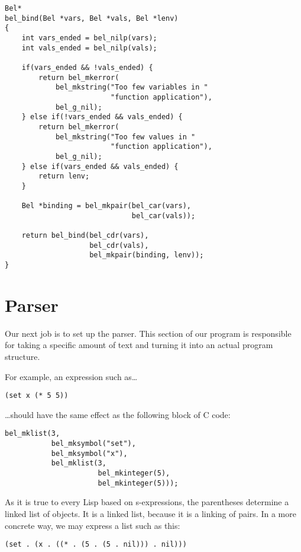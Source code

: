 \documentclass[openright,a4paper,twoside,12pt]{memoir}
\begin{document}
\begin{verbatim}
Bel*
bel_bind(Bel *vars, Bel *vals, Bel *lenv)
{
    int vars_ended = bel_nilp(vars);
    int vals_ended = bel_nilp(vals);

    if(vars_ended && !vals_ended) {
        return bel_mkerror(
            bel_mkstring("Too few variables in "
                         "function application"),
            bel_g_nil);
    } else if(!vars_ended && vals_ended) {
        return bel_mkerror(
            bel_mkstring("Too few values in "
                         "function application"),
            bel_g_nil);
    } else if(vars_ended && vals_ended) {
        return lenv;
    }

    Bel *binding = bel_mkpair(bel_car(vars),
                              bel_car(vals));

    return bel_bind(bel_cdr(vars),
                    bel_cdr(vals),
                    bel_mkpair(binding, lenv));
}
\end{verbatim}

\chapter{Parser}
\label{sec:org95d9a30}

Our next job is  to set up the parser. This section  of our program is
responsible for taking  a specific amount of text and  turning it into
an actual program structure.

For example, an expression such as\ldots{}

\begin{verbatim}
(set x (* 5 5))
\end{verbatim}

\ldots{}should have the same effect as the following block of C code:

\begin{verbatim}
bel_mklist(3,
           bel_mksymbol("set"),
           bel_mksymbol("x"),
           bel_mklist(3,
                      bel_mkinteger(5),
                      bel_mkinteger(5)));
\end{verbatim}

As it  is true to every  Lisp based on s-expressions,  the parentheses
determine a linked list of objects. It is a linked list, because it is
a linking of pairs. In a more concrete way, we may express a list such
as this:

\begin{verbatim}
(set . (x . ((* . (5 . (5 . nil))) . nil)))
\end{verbatim}
\end{document}
